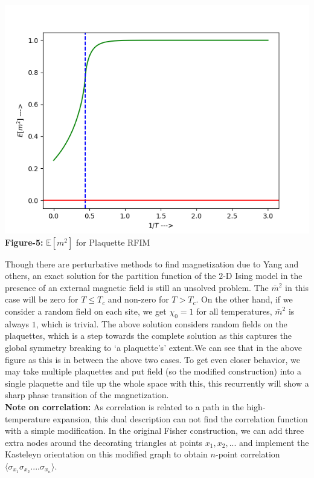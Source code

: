 \documentclass{article}
\begin{document}
	\begin{center}
		\includegraphics[scale=0.2]{Susceptibility.png}\\
	\textbf{Figure-5:} $\mathbb E[m^2]$ for Plaquette RFIM\\
	\end{center} 
	
	Though there are perturbative methods to find magnetization due to Yang and others, an exact solution for the partition function of the $2$-D Ising model in the presence of an external magnetic field is still an unsolved problem. The $\bar m^2$ in this case will be zero for $T\leq T_c$ and non-zero for $T >T_c$. On the other hand, if we consider a random field on each site, we get $\chi_0=1$ for all temperatures, $\bar m^2$ is always $1$, which is trivial. The above solution considers random fields on the plaquettes, which is a step towards the complete solution as this captures the global symmetry breaking to `a plaquette's' extent.We can see that in the above figure as this is in between the above two cases. To get even closer behavior, we may take multiple plaquettes and put field (so the modified construction) into a single plaquette and tile up the whole space with this, this recurrently will show a sharp phase transition of the magnetization.\\
	
	
	\textbf{Note on correlation:} As correlation is related to a path in the high-temperature expansion, this dual description can not find the correlation function with a simple modification. In the original Fisher construction, we can add three extra nodes around the decorating triangles at points $x_1,x_2,...$ and implement the Kasteleyn orientation on this modified graph to obtain $n$-point correlation $\langle \sigma_{x_1}\sigma_{x_2}....\sigma_{x_n} \rangle$.\\
	
\end{document}
